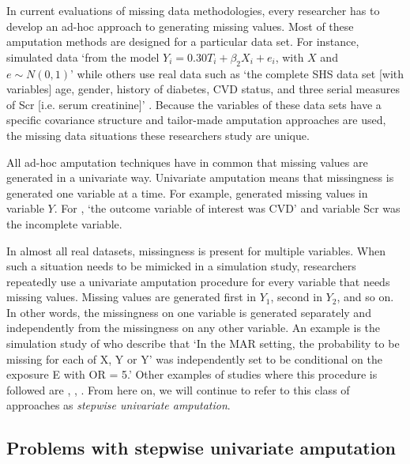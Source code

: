 \documentclass[]{interact}
\begin{document}
In current evaluations of missing data methodologies, every researcher has to develop an ad-hoc approach to generating missing values. Most of these amputation methods are designed for a particular data set. For instance, \citep[][p. 4]{Sullivan2016} simulated data `from the model $Y_i = 0.30T_i + \beta_2X_i + e_i$, with $X$ and $e \sim N(0, 1)$' while others use real data such as `the complete SHS data set [with variables] age, gender, history of diabetes, CVD status, and three serial measures of Scr [i.e. serum creatinine]' \citep[][p. 3]{Shara2015}. Because the variables of these data sets have a specific covariance structure and tailor-made amputation approaches are used, the missing data situations these researchers study are unique.

All ad-hoc amputation techniques have in common that missing values are generated in a univariate way. Univariate amputation means that missingness is generated one variable at a time. For example, \citep{Sullivan2016} generated missing values in variable $Y$. For \citep[][p. 3]{Shara2015}, `the outcome variable of interest was CVD' and variable Scr was the incomplete variable. 

In almost all real datasets, missingness is present for multiple variables. When such a situation needs to be mimicked in a simulation study, researchers repeatedly use a univariate amputation procedure for every variable that needs missing values. Missing values are generated first in $Y_1$, second in $Y_2$, and so on. In other words, the missingness on one variable is generated separately and independently from the missingness on any other variable. An example is the simulation study of\citep[][p. 3]{Kontopantelis2017} who describe that `In the MAR setting, the probability to be missing for each of X, Y or Y' was independently set to be conditional on the exposure E with OR = 5.' Other examples of studies where this procedure is followed are \citep{Abrahantes2011}, \citep{Kalaycioglu2016}, \citep{Pastor2003}. From here on, we will continue to refer to this class of approaches as \textit{stepwise univariate amputation}.

\subsection{\normalsize Problems with stepwise univariate amputation}\label{problems}
\end{document}
